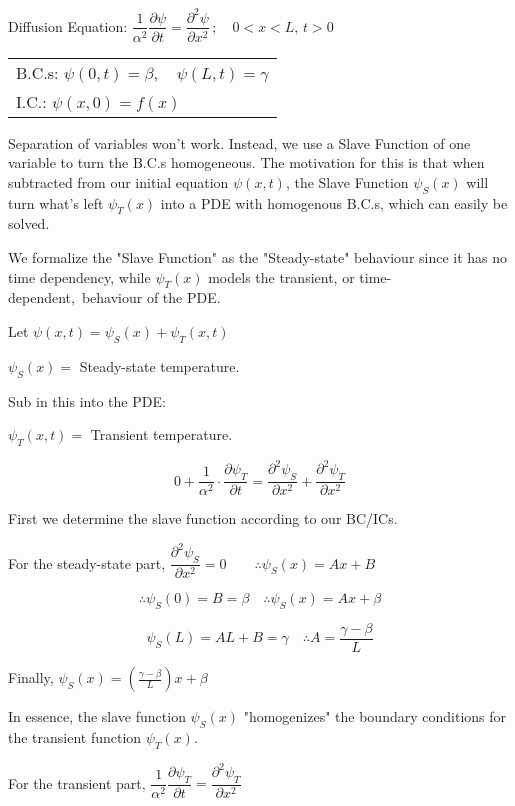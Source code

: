 \documentclass{report}
\begin{document}
\noindent Diffusion Equation: $\dfrac{1}{\alpha^{2}} \dfrac{\partial \psi}{\partial t}=\dfrac{\partial^{2} \psi}{\partial x^{2}}\, ;\quad 0<x<L,\, t>0$\\[-2ex]

\begin{flushleft}
\begin{tabular}{@{}l@{}}
B.C.s: $\psi(0,t)=\beta,\quad \psi(L,t)=\gamma$\\[1ex]
I.C.: $\psi(x,0)=f(x)$
\end{tabular}
\end{flushleft}

Separation of variables won't work. Instead, we use a Slave Function of one variable to turn the B.C.s homogeneous. The motivation for this is that when subtracted from our initial equation $\psi(x,t)$, the Slave Function $\psi_{S}(x)$ will turn what's left $\psi_{T}(x)$ into a PDE with homogenous B.C.s, which can easily be solved. 

We formalize the "Slave Function" as the "Steady-state" behaviour since it has no time dependency, while $\psi_{T}(x)$ models the transient, or time-dependent, behaviour of the PDE. 

Let $\psi(x, t)=\psi_{S}(x)+\psi_{T}(x, t)$

$\psi_{S}(x)=$ Steady-state temperature.

Sub in this into the PDE:

$\psi_{T}(x, t)=$ Transient temperature.

$$
0+\dfrac{1}{\alpha^{2}} \cdot \dfrac{\partial \psi_{T}}{\partial t}=\dfrac{\partial^{2} \psi_{S}}{\partial x^{2}}+\dfrac{\partial^{2} \psi_{T}}{\partial x^{2}}
$$

First we determine the slave function according to our BC/ICs. 

For the steady-state part, $\dfrac{\partial^{2} \psi_{S}}{\partial x^{2}}=0 \qquad \therefore \psi_{S}(x)=Ax+B$

$$\therefore \psi_{S}(0)=B=\beta\quad \therefore \psi_{S}(x)=A x+\beta$$

$$
\psi_{S}(L)=A L+B=\gamma \quad \therefore A=\dfrac{\gamma-\beta}{L}
$$

Finally, $\boxed{\psi_{S}(x)=\left(\frac{\gamma-\beta}{L}\right)x+\beta}$

In essence, the slave function $\psi_{S}(x)$ "homogenizes" the boundary conditions for the transient function $\psi_{T}(x)$.

For the transient part, $\dfrac{1}{\alpha^{2}} \dfrac{\partial \psi_{T}}{\partial t}=\dfrac{\partial^{2} \psi_{T}}{\partial x^{2}}$
\end{document}
